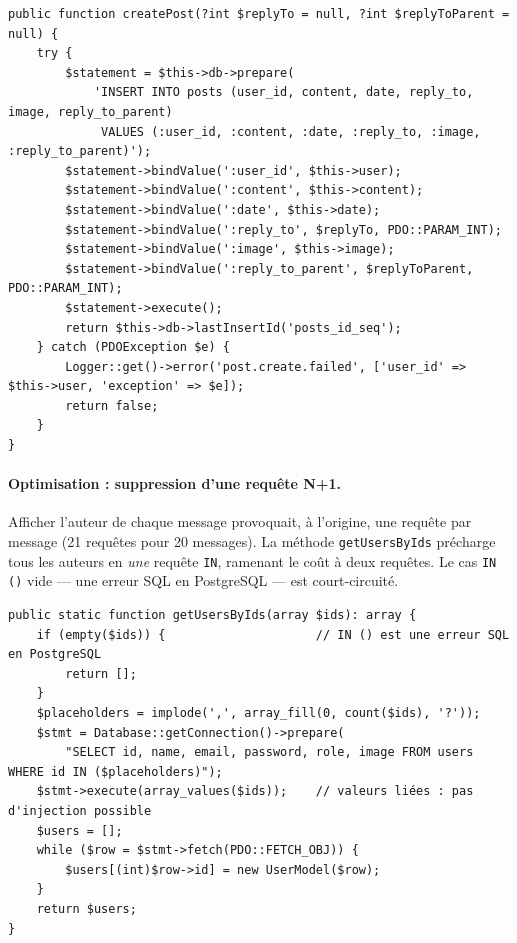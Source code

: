 \begin{lstlisting}[style=php, caption={Insertion par requête préparée — \file{modules/models/PostModel.php}}]
public function createPost(?int $replyTo = null, ?int $replyToParent = null) {
    try {
        $statement = $this->db->prepare(
            'INSERT INTO posts (user_id, content, date, reply_to, image, reply_to_parent)
             VALUES (:user_id, :content, :date, :reply_to, :image, :reply_to_parent)');
        $statement->bindValue(':user_id', $this->user);
        $statement->bindValue(':content', $this->content);
        $statement->bindValue(':date', $this->date);
        $statement->bindValue(':reply_to', $replyTo, PDO::PARAM_INT);
        $statement->bindValue(':image', $this->image);
        $statement->bindValue(':reply_to_parent', $replyToParent, PDO::PARAM_INT);
        $statement->execute();
        return $this->db->lastInsertId('posts_id_seq');
    } catch (PDOException $e) {
        Logger::get()->error('post.create.failed', ['user_id' => $this->user, 'exception' => $e]);
        return false;
    }
}
\end{lstlisting}

\paragraph{Optimisation : suppression d'une requête N+1.} Afficher l'auteur de chaque message
provoquait, à l'origine, une requête par message (21 requêtes pour 20 messages). La méthode
\texttt{getUsersByIds} précharge tous les auteurs en \emph{une} requête \texttt{IN}, ramenant le
coût à deux requêtes. Le cas \texttt{IN ()} vide — une erreur SQL en PostgreSQL — est court-circuité.

\begin{lstlisting}[style=php, caption={Préchargement des auteurs en une requête — \file{modules/models/UserModel.php}}]
public static function getUsersByIds(array $ids): array {
    if (empty($ids)) {                     // IN () est une erreur SQL en PostgreSQL
        return [];
    }
    $placeholders = implode(',', array_fill(0, count($ids), '?'));
    $stmt = Database::getConnection()->prepare(
        "SELECT id, name, email, password, role, image FROM users WHERE id IN ($placeholders)");
    $stmt->execute(array_values($ids));    // valeurs liées : pas d'injection possible
    $users = [];
    while ($row = $stmt->fetch(PDO::FETCH_OBJ)) {
        $users[(int)$row->id] = new UserModel($row);
    }
    return $users;
}
\end{lstlisting}

